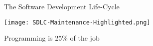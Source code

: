 \begin{frame}{The Software Development Life-Cycle}
\begin{center}
\texttt{[image: SDLC-Maintenance-Highlighted.png]}
\end{center}
\end{frame}

\begin{frame}{Programming is 25\% of the job}
\end{frame}